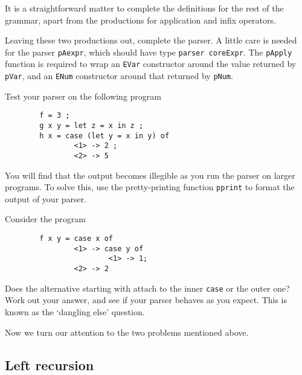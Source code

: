 It is a straightforward matter to complete the definitions for the rest
of the grammar, apart from the productions for application and
infix operators.
\begin{exercise}
Leaving these two productions out, complete the parser.
A little care is needed for the parser \mbox{\tt pAexpr}, which should
have type \mbox{\tt parser\ coreExpr}.  The \mbox{\tt pApply} function is required
to wrap an \mbox{\tt EVar} constructor around the value returned by \mbox{\tt pVar},
and an \mbox{\tt ENum} constructor around that returned by \mbox{\tt pNum}.

Test your parser on the following program
\begin{verbatim}
        f = 3 ;
        g x y = let z = x in z ;
        h x = case (let y = x in y) of
                <1> -> 2 ;
                <2> -> 5
\end{verbatim}
You will find that the output becomes illegible as you run the parser
on larger programs.  To solve this, use
the pretty-printing function \mbox{\tt pprint} to format the
output of your parser.
\end{exercise}

\begin{exercise}
Consider the program
\begin{verbatim}
        f x y = case x of
                <1> -> case y of
                        <1> -> 1;
                <2> -> 2
\end{verbatim}
Does the alternative starting with \mbox{\tt <2>} attach to the inner \mbox{\tt case} or
the outer one?  Work out your answer, and see if your parser behaves as you
expect.  This is known as the `dangling else'
question.
\end{exercise}

Now we turn our attention to the two problems mentioned above.

\subsection{Left recursion}

